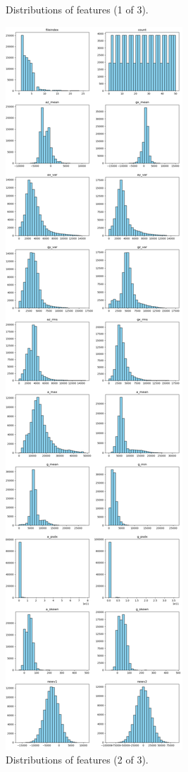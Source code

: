 \documentclass[10pt,twocolumn]{article}
\begin{document}
\begin{figure}[H]
    \caption{Distributions of features (1 of 3).}
    \label{fig:distribution-1}
\end{figure}

\begin{figure}[H]
    \centering
    \includegraphics[width=0.85\linewidth, height=0.9\textheight]{images/distribution_2.png}
    \caption{Distributions of features (2 of 3).}
    \label{fig:distribution-2}
\end{figure}
\end{document}
